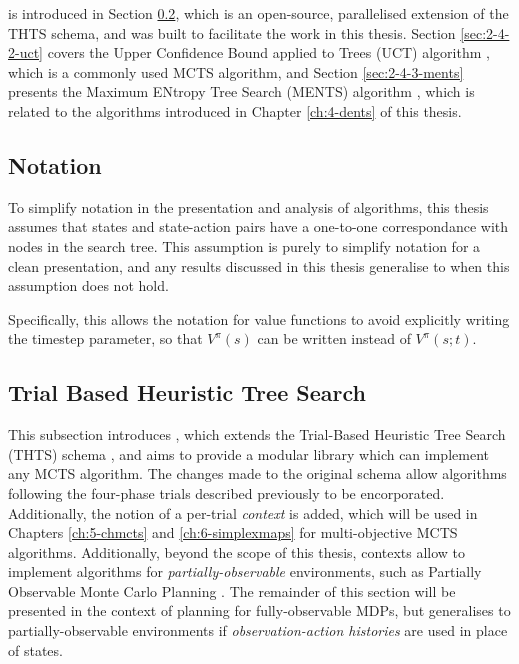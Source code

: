     \thtspp\ewe \cite{thtspp} is introduced in Section \ref{sec:2-4-1-thts}, which is an open-source, parallelised extension of the THTS schema, and was built to facilitate the work in this thesis. Section \ref{sec:2-4-2-uct} covers the Upper Confidence Bound applied to Trees (UCT) algorithm \cite{uct,uct_long}, which is a commonly used MCTS algorithm, and Section \ref{sec:2-4-3-ments} presents the Maximum ENtropy Tree Search (MENTS) algorithm \cite{ments}, which is related to the algorithms introduced in Chapter \ref{ch:4-dents} of this thesis.
    
    


    




    \subsection{Notation}
    \label{sec:2-4-0-notation}
        To simplify notation in the presentation and analysis of \thtspp\ewe algorithms, this thesis assumes that states and state-action pairs have a one-to-one correspondance with nodes in the search tree. This assumption is purely to simplify notation for a clean presentation, and any results discussed in this thesis generalise to when this assumption does not hold. 

        Specifically, this allows the notation for value functions to avoid explicitly writing the timestep parameter, so that $V^{\pi}(s)$ can be written instead of $V^{\pi}(s;t)$.






    \subsection{Trial Based Heuristic Tree Search}
    \label{sec:2-4-1-thts}

        This subsection introduces \thtspp\ewe, which extends the Trial-Based Heuristic Tree Search (THTS) schema \cite{thts}, and aims to provide a modular library which can implement any MCTS algorithm. The changes made to the original schema allow algorithms following the four-phase \mctsone trials described previously to be encorporated. Additionally, the notion of a per-trial \textit{context} is added, which will be used in Chapters \ref{ch:5-chmcts} and \ref{ch:6-simplexmaps} for multi-objective MCTS algorithms. Additionally, beyond the scope of this thesis, contexts allow \thtspp\ewe to implement algorithms for \textit{partially-observable} environments, such as Partially Observable Monte Carlo Planning \cite{pomcp}. The remainder of this section will be presented in the context of planning for fully-observable MDPs, but generalises to partially-observable environments if \textit{observation-action histories} are used in place of states.

